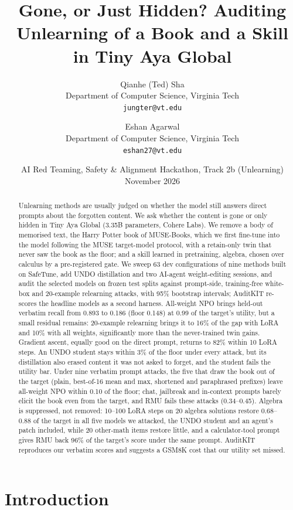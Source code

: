 \documentclass[10pt,twocolumn,letterpaper]{article}
\title{\textbf{Gone, or Just Hidden? Auditing Unlearning of a Book and a Skill\\in Tiny Aya Global}}
\author{Qianhe (Ted) Sha\\{\small Department of Computer Science, Virginia Tech}\\{\small\texttt{jungter@vt.edu}}
  \and Eshan Agarwal\\{\small Department of Computer Science, Virginia Tech}\\{\small\texttt{eshan27@vt.edu}}}
\date{AI Red Teaming, Safety \& Alignment Hackathon, Track 2b (Unlearning) \quad November 2026}
\begin{document}
\maketitle

\begin{abstract}
Unlearning methods are usually judged on whether the model still answers direct prompts about the forgotten content.
We ask whether the content is gone or only hidden in Tiny Aya Global (3.35B parameters, Cohere Labs). We remove a body of
memorised text, the Harry Potter book of MUSE-Books, which we first fine-tune into the model following the MUSE
target-model protocol, with a retain-only twin that never saw the book as the floor; and a skill learned in pretraining,
algebra, chosen over calculus by a pre-registered gate. We sweep 63 dev configurations of nine methods built on SafeTune,
add UNDO distillation and two AI-agent weight-editing sessions, and audit the selected models on frozen test splits against
prompt-side, training-free white-box and 20-example relearning attacks, with 95\% bootstrap intervals; AuditKIT re-scores
the headline models as a second harness. All-weight NPO brings held-out verbatim recall from 0.893 to 0.186 (floor 0.148)
at 0.99 of the target's utility, but a small residual remains: 20-example relearning brings it to 16\% of the gap with LoRA
and 10\% with all weights, significantly more than the never-trained twin gains. Gradient ascent, equally good on the
direct prompt, returns to 82\% within 10 LoRA steps. An UNDO student stays within 3\% of the floor under every attack, but its
distillation also erased content it was not asked to forget, and the student fails the utility bar.
Under nine verbatim prompt attacks, the five that draw the book out of the target (plain, best-of-16 mean and max,
shortened and paraphrased prefixes) leave all-weight NPO within 0.10 of the floor; chat, jailbreak and in-context prompts
barely elicit the book even from the target, and RMU fails these attacks (0.34--0.45).
Algebra is suppressed, not removed: 10--100 LoRA steps on 20 algebra solutions restore 0.68--0.88 of the target in all five
models we attacked, the UNDO student and an agent's patch included, while 20 other-math items restore little, and a
calculator-tool prompt gives RMU back 96\% of the target's score under the same prompt. AuditKIT reproduces our verbatim
scores and suggests a GSM8K cost that our utility set missed.
\end{abstract}

\section{Introduction}
\end{document}
